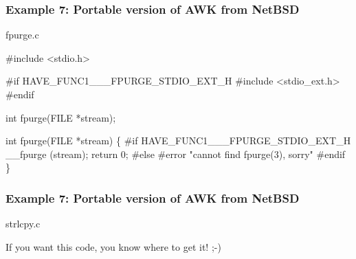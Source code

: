 \documentclass[hyperref={colorlinks=true}]{beamer}
\begin{document}
\begin{frame}[fragile]
  \frametitle{Example 7: Portable version of AWK from NetBSD}

\begin{block}{fpurge.c}
\begin{CodeNoLabelSmallest}
#include <stdio.h>

#if HAVE\_FUNC1\_\_\_FPURGE\_STDIO\_EXT\_H
#include <stdio\_ext.h>
#endif

int fpurge(FILE *stream);

int fpurge(FILE *stream)
\{
#if HAVE\_FUNC1\_\_\_FPURGE\_STDIO\_EXT\_H
  \_\_fpurge (stream);
  return 0;
#else
#error "cannot find fpurge(3), sorry"
#endif
\}
\end{CodeNoLabelSmallest}
\end{block}
\end{frame}

\begin{frame}[fragile]
  \frametitle{Example 7: Portable version of AWK from NetBSD}

\begin{block}{strlcpy.c}
\begin{CodeNoLabel}
If you want this code, you know where to get it! ;-)
\end{CodeNoLabel}
\end{block}
\end{frame}
\end{document}
